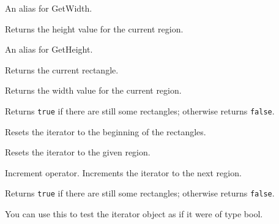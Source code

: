 An alias for GetWidth.


\label{wxregioniteratorgetheight}


Returns the height value for the current region.


\label{wxregioniteratorgeth}


An alias for GetHeight.


\label{wxregioniteratorgetrect}


Returns the current rectangle.


\label{wxregioniteratorgetwidth}


Returns the width value for the current region.


\label{wxregioniteratorhaverects}


Returns {\tt true} if there are still some rectangles; otherwise returns {\tt false}.


\label{wxregioniteratorreset}


Resets the iterator to the beginning of the rectangles.


Resets the iterator to the given region.


\label{wxregioniteratorinc}


Increment operator. Increments the iterator to the next region.



\label{wxregioniteratorbool}


Returns {\tt true} if there are still some rectangles; otherwise returns {\tt false}.

You can use this to test the iterator object as if it were of type bool.

